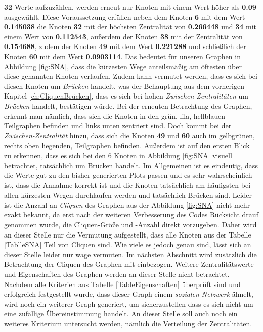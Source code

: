 \textbf{32} Werte aufzuzählen, werden erneut nur Knoten mit einem Wert höher als \textbf{0.09} ausgewählt. Diese Voraussetzung erfüllen neben dem Knoten \textbf{6} mit dem Wert \textbf{0.145038} die Knoten \textbf{32} mit der höchsten Zentralität von \textbf{0.266448} und \textbf{34} mit einem Wert von \textbf{0.112543}, außerdem der Knoten \textbf{38} mit der Zentralität von \textbf{0.154688}, zudem der Knoten \textbf{49} mit dem Wert \textbf{0.221288} und schließlich der Knoten \textbf{60} mit dem Wert \textbf{0.0903114}. Das bedeutet für unseren Graphen in Abbildung \ref{fig:SNA}, dass die kürzesten Wege anteilsmäßig am öftesten über diese genannten Knoten verlaufen. Zudem kann vermutet werden, dass es sich bei diesen Knoten um \textit{Brücken} handelt, was der Behauptung aus dem vorherigen Kapitel \ref{ch:CliquenBrücken}, dass es sich bei hohen \textit{Zwischen-Zentralitäten} um \textit{Brücken} handelt, bestätigen würde. Bei der erneuten Betrachtung des Graphen, erkennt man nämlich, dass sich die Knoten in den grün, lila, hellblauen Teilgraphen befinden und links unten zentriert sind. Doch kommt bei der \textit{Zwischen-Zentralität} hinzu, dass sich die Knoten \textbf{49} und \textbf{60} auch im gelbgrünen, rechts oben liegenden, Teilgraphen befinden. Außerdem ist auf den ersten Blick zu erkennen, dass es sich bei den 6 Knoten in Abbildung \ref{fig:SNA} visuell betrachtet, tatsächlich um Brücken handelt. Im Allgemeinen ist es eindeutig, dass die Werte gut zu den bisher generierten Plots passen und es sehr wahrscheinlich ist, dass die Annahme korrekt ist und die Knoten tatsächlich am häufigsten bei allen kürzesten Wegen durchlaufen werden und tatsächlich Brücken sind. Leider ist die Anzahl an \textit{Cliquen} des Graphen aus der Abbildung \ref{fig:SNA} nicht mehr exakt bekannt, da erst nach der weiteren Verbesserung des Codes Rücksicht drauf genommen wurde, die Cliquen-Größe und -Anzahl direkt vorzugeben. Daher wird an dieser Stelle nur die Vermutung aufgestellt, dass alle Knoten aus der Tabelle \ref{TablleSNA} Teil von Cliquen sind. Wie viele es jedoch genau sind, lässt sich an dieser Stelle leider nur wage vermuten. Im nächsten Abschnitt wird zusätzlich die Betrachtung der Cliquen des Graphen mit einbezogen. Weitere Zentralitätswerte und Eigenschaften des Graphen werden an dieser Stelle nicht betrachtet. Nachdem alle Kriterien aus Tabelle \ref{TableEigenschaften} überprüft sind und erfolgreich festgestellt wurde, dass dieser Graph einem \textit{sozialen Netzwerk} ähnelt, wird noch ein weiterer Graph generiert, um sicherzustellen dass es sich nicht um eine zufällige Übereinstimmung handelt. An dieser Stelle soll auch noch ein weiteres Kriterium untersucht werden, nämlich die Verteilung der Zentralitäten.


